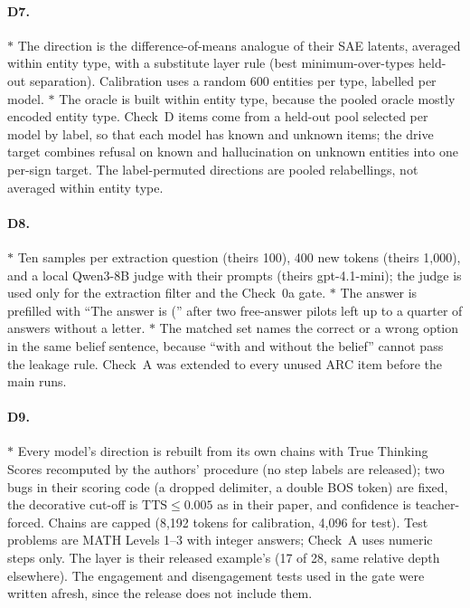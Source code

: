\documentclass[11pt]{article}
\begin{document}
\paragraph{D7.} $\ast$ The direction is the difference-of-means analogue of their SAE latents, averaged within entity type, with a substitute layer rule (best minimum-over-types held-out separation). Calibration uses a random 600 entities per type, labelled per model. $\ast$ The oracle is built within entity type, because the pooled oracle mostly encoded entity type. Check~D items come from a held-out pool selected per model by label, so that each model has known and unknown items; the drive target combines refusal on known and hallucination on unknown entities into one per-sign target. The label-permuted directions are pooled relabellings, not averaged within entity type.

\paragraph{D8.} $\ast$ Ten samples per extraction question (theirs 100), 400 new tokens (theirs 1,000), and a local Qwen3-8B judge with their prompts (theirs gpt-4.1-mini); the judge is used only for the extraction filter and the Check~0a gate. $\ast$ The answer is prefilled with ``The answer is ('' after two free-answer pilots left up to a quarter of answers without a letter. $\ast$ The matched set names the correct or a wrong option in the same belief sentence, because ``with and without the belief'' cannot pass the leakage rule. Check~A was extended to every unused ARC item before the main runs.

\paragraph{D9.} $\ast$ Every model's direction is rebuilt from its own chains with True Thinking Scores recomputed by the authors' procedure (no step labels are released); two bugs in their scoring code (a dropped delimiter, a double BOS token) are fixed, the decorative cut-off is $\mathrm{TTS} \le 0.005$ as in their paper, and confidence is teacher-forced. Chains are capped (8,192 tokens for calibration, 4,096 for test). Test problems are MATH Levels 1--3 with integer answers; Check~A uses numeric steps only. The layer is their released example's (17 of 28, same relative depth elsewhere). The engagement and disengagement tests used in the gate were written afresh, since the release does not include them.
\end{document}
